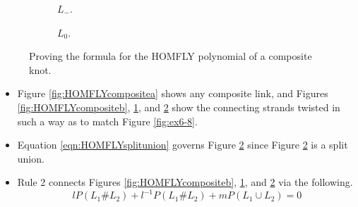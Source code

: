 \documentclass[titlepage]{article}
\numberwithin{figure}{section}
\numberwithin{table}{section}
\numberwithin{equation}{section}
\begin{document}
\begin{itemize}
\begin{figure}[H]
\begin{subfigure}[b]{0.2\linewidth}
            \caption{$L_-$.}
            \label{fig:HOMFLYcompositec}
        \end{subfigure}
        \begin{subfigure}[b]{0.2\linewidth}
            \centering
            \caption{$L_0$.}
            \label{fig:HOMFLYcomposited}
        \end{subfigure}
        \caption{Proving the formula for the HOMFLY polynomial of a composite knot.}
        \label{fig:HOMFLYcomposite}
    \end{figure}
    \begin{itemize}
        \item Figure \ref{fig:HOMFLYcompositea} shows any composite link, and Figures \ref{fig:HOMFLYcompositeb}, \ref{fig:HOMFLYcompositec}, and \ref{fig:HOMFLYcomposited} show the connecting strands twisted in such a way as to match Figure \ref{fig:ex6-8}.
        \item Equation \ref{eqn:HOMFLYsplitunion} governs Figure \ref{fig:HOMFLYcomposited} since Figure \ref{fig:HOMFLYcomposited} is a split union.
        \item Rule 2 connects Figures \ref{fig:HOMFLYcompositeb}, \ref{fig:HOMFLYcompositec}, and \ref{fig:HOMFLYcomposited} via the following.
        \begin{equation*}
            lP(L_1\#L_2)+l^{-1}P(L_1\#L_2)+mP(L_1\cup L_2)=0

\end{equation*}
\end{itemize}
\end{itemize}
\end{document}
